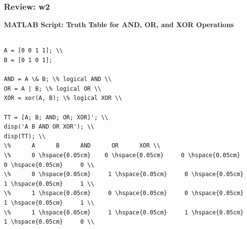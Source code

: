\documentclass[
	11pt, %
]{beamer}
\begin{document}
\begin{frame}
	\frametitle{Review: w2}
\textbf{MATLAB Script: Truth Table for AND, OR, and XOR Operations}

\begin{verbatim}

A = [0 0 1 1]; \\
B = [0 1 0 1];

AND = A \& B; \% logical AND \\
OR = A | B; \% logical OR \\
XOR = xor(A, B); \% logical XOR \\

TT = [A; B; AND; OR; XOR]'; \\
disp('A B AND OR XOR'); \\
disp(TT); \\
\%      A      B      AND      OR      XOR \\
\%      0 \hspace{0.05cm}    0 \hspace{0.05cm}     0 \hspace{0.05cm}     0 \hspace{0.05cm}     0 \\
\%      0 \hspace{0.05cm}     1 \hspace{0.05cm}     0 \hspace{0.05cm}     1 \hspace{0.05cm}     1 \\
\%      1 \hspace{0.05cm}     0 \hspace{0.05cm}     0 \hspace{0.05cm}     1 \hspace{0.05cm}     1 \\
\%      1 \hspace{0.05cm}     1 \hspace{0.05cm}     1 \hspace{0.05cm}     1 \hspace{0.05cm}     0 \\
\end{verbatim}
\end{frame}
\end{document}
